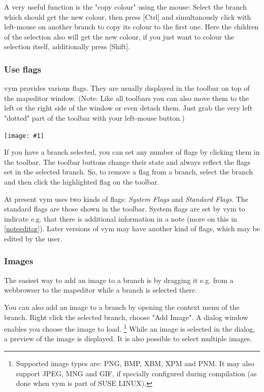 \documentclass[12pt,a4paper]{article}
\newcommand{\maximage}[1]{  
    \begin{center}
        \texttt{[image: \#1]} 
    \end{center}
}
\newcommand{\vym}{{\sc vym }}
\newcommand{\key}[1]{[#1]}
\begin{document}
A very useful function is the "copy colour" using the mouse: Select the
branch which should get the new colour, then press \key{Ctrl} and
simultanously click with left-mouse on another branch to copy its colour
to the first one. Here the children of the selection also will get the new
colour, if you just want to colour the selection itself, additionally
press \key{Shift}.

\subsubsection*{Use flags}
\vym provides various flags. They are usually displayed in the toolbar on top of the
mapeditor window. (Note: Like all toolbars you can also move them to the
left or the right side of the window or even detach them. Just grab the
very left "dotted" part of the toolbar with your left-mouse button.) 
    \maximage{images/default-flags.png}
If you have a branch selected, you can set any number of flags by
clicking them in the toolbar. The toolbar buttons change their state and
always reflect the flags set in the selected branch. So, to remove a flag from a branch, select the branch and then click the highlighted flag on the toolbar.

At present \vym uses two kinds of flags: {\em System Flags} and {\em
Standard Flags}. The standard flags are those shown in the toolbar.
System flags are set by \vym to indicate e.g. that there is additional
information in a note (more on this in \ref{noteeditor}). Later versions
of \vym may have another kind of flags, which may be edited by the user.

\subsubsection*{Images}
The easiest way to add an image to a branch is by dragging it e.g. from a
webbrowser to the mapeditor while a branch is selected there.

You can also add an image to a branch by opening the context menu of the
branch. Right click the selected branch, choose "Add Image". A
dialog window enables you choose the image to load. 
\footnote{Supported image types are: PNG, BMP, XBM, XPM and PNM. It may
    also support JPEG, MNG and GIF, if specially configured during
    compilation (as done when \vym is part of SUSE LINUX).}
While an image is selected in the dialog, a preview of the
image is displayed. It is also possible to select multiple images.  
\end{document}
